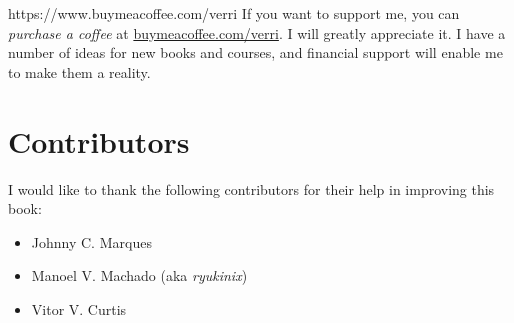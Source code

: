 \vfill

\begin{parwithqr}{https://www.buymeacoffee.com/verri}
  If you want to support me, you can \emph{purchase a coffee} at
  \href{\aurl}{buymeacoffee.com/verri}. I will greatly appreciate it.  I have a number of
  ideas for new books and courses, and financial support will enable me to make them a
  reality.
\end{parwithqr}

\newpage

\section*{Contributors}

I would like to thank the following contributors for their help in improving this book:

\begin{itemize}
  \itemsep0em
  \item Johnny C. Marques
  \item Manoel V. Machado (aka \emph{ryukinix})
  \item Vitor V. Curtis
\end{itemize}
